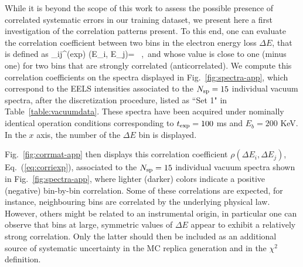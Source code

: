 {While it is beyond the scope of this work to
assess the possible presence of correlated systematic
errors in our training dataset, we present here a first
investigation of the correlation patterns present.
%
To this end, one can evaluate the correlation coefficient
between two bins in the electron energy loss $\Delta E$, that is
defined as
 \be
\label{eq:corriexp}
\rho_{ij}^{\rm (exp)} \equiv \rho(\Delta E_i, \Delta E_j)=  \, ,\,
\ee
and whose value is close to one (minus one) for two bins that are strongly
correlated (anticorrelated).
%
We compute this correlation coefficients on the spectra displayed
in Fig.~\ref{fig:spectra-app}, which correspond to
the EELS intensities associated
to the $N_{\rm sp}=15$ individual vacuum spectra, after the discretization
procedure, listed as ``Set 1"
in Table~\ref{table:vacuumdata}.
%
These spectra have been acquired under nominally
identical operation conditions 
corresponding to $t_{\rm exp}=100$ ms and $E_b=200$ KeV.
%
In the $x$ axis, the number of the $\Delta E$ bin is displayed.


Fig.~\ref{fig:corrmat-app} then displays this correlation coefficient $\rho(\Delta E_i,\Delta E_j)$, Eq.~(\ref{eq:corriexp}), associated
to the $N_{\rm sp}=15$ individual vacuum spectra shown
in Fig.~\ref{fig:spectra-app}, where lighter (darker)
colors indicate a positive (negative) bin-by-bin correlation.
%
Some of these correlations are expected, for instance, neighbouring
bins are correlated by the underlying physical law.
%
However, others
might be related to an instrumental origin,
in particular one can observe that bins
at large, symmetric values of $\Delta E$ appear to exhibit
a relatively strong correlation.
%
Only the latter should then be included as an additional
source of systematic uncertainty in the MC replica generation
and in the $\chi^2$ definition.

}
